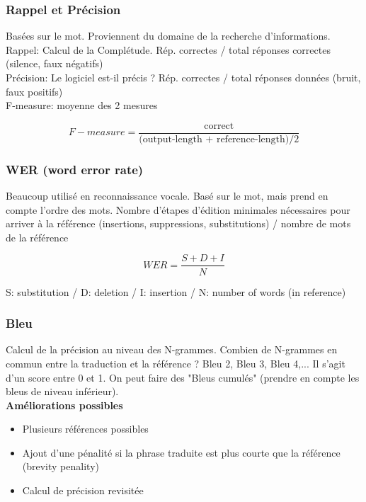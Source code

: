 \subsubsection{Rappel et Précision}

Basées sur le mot.
Proviennent du domaine de la recherche d’informations. \\

Rappel: Calcul de la Complétude. Rép. correctes / total réponses correctes (silence, faux négatifs) \\

Précision: Le logiciel est-il précis ? Rép. correctes / total réponses données (bruit, faux positifs) \\

F-measure: moyenne des 2 mesures

$$F-measure = \frac{\text{correct}}{\text{(output-length + reference-length)}/2}$$

\subsubsection{WER (word error rate)}

Beaucoup utilisé en reconnaissance vocale. Basé sur le mot, mais prend en compte l’ordre des mots. Nombre d’étapes d’édition minimales nécessaires pour arriver à la référence (insertions, suppressions, substitutions) / nombre de mots de la référence

$$WER = \frac{S+D+I}{N}$$

\vspace{0.5cm}

S: substitution /
D: deletion /
I: insertion /
N: number of words (in reference)

\subsubsection{Bleu}

Calcul de la précision au niveau des N-grammes. Combien de N-grammes en commun entre la traduction et la référence ?
Bleu 2, Bleu 3, Bleu 4,... Il s'agit d'un score entre 0 et 1. On peut faire des "Bleus cumulés" (prendre en compte les bleus de niveau inférieur).\\

\textbf{Améliorations possibles}

\begin{itemize}
    \item Plusieurs références possibles
    \item Ajout d’une pénalité si la phrase traduite est plus courte que la référence (brevity penality)
    \item Calcul de précision revisitée\\
\end{itemize}

